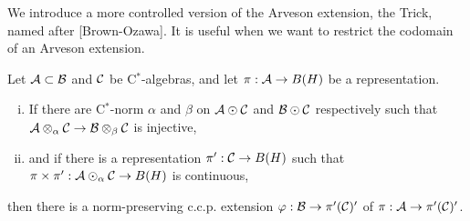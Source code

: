 \documentclass{../../small}
\begin{document}
We introduce a  more controlled version of the Arveson extension, the Trick, named after [Brown-Ozawa].
It is useful when we want to restrict the codomain of an Arveson extension.
\begin{thm}
Let $\mathcal{A}\subset\mathcal{B}$ and $\mathcal{C}$ be C$^*$-algebras, and let $\pi:\mathcal{A}\to B(H)$ be a representation.
\begin{enumerate}[(i)]
\item If there are C$^*$-norm $\alpha$ and $\beta$ on $\mathcal{A}\odot\mathcal{C}$ and $\mathcal{B}\odot\mathcal{C}$ respectively such that $\mathcal{A}\otimes_\alpha\mathcal{C}\to\mathcal{B}\otimes_\beta\mathcal{C}$ is injective,
\item and if there is a representation $\pi':\mathcal{C}\to B(H)$ such that $\pi\times\pi':\mathcal{A}\odot_\alpha\mathcal{C}\to B(H)$ is continuous,
\end{enumerate}
then there is a norm-preserving c.c.p. extension $\varphi:\mathcal{B}\to\pi'(\mathcal{C})'$ of $\pi:\mathcal{A}\to\pi'(\mathcal{C})'$.
\end{thm}
\end{document}
